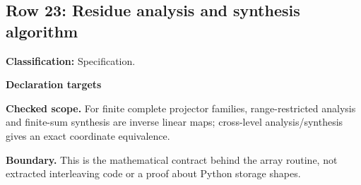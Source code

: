 \subsection{Row 23: Residue analysis and synthesis algorithm}
\label{row:23}
\textbf{Classification:} Specification.
\par\smallskip\textbf{Declaration targets}\par
{\small\noindent{}\par}
{\small\noindent{}\par}
{\small\noindent{}\par}
{\small\noindent{}\par}
\smallskip\textbf{Checked scope.} For finite complete projector families, range-restricted analysis and finite-sum synthesis are inverse linear maps; cross-level analysis/synthesis gives an exact coordinate equivalence.
\par\smallskip\textbf{Boundary.} This is the mathematical contract behind the array routine, not extracted interleaving code or a proof about Python storage shapes.
\medskip
{}
